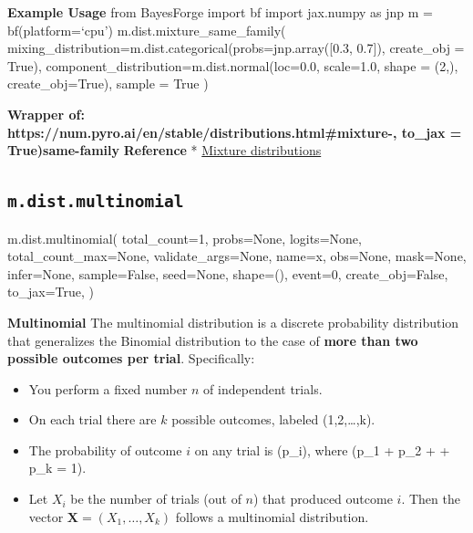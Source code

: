 \documentclass[
  letterpaper,
  DIV=11,
  numbers=noendperiod]{scrartcl}
\newenvironment{Shaded}{\begin{snugshade}}{\end{snugshade}}
\newcommand{\DecValTok}[1]{\textcolor[rgb]{0.68,0.00,0.00}{#1}}
\newcommand{\NormalTok}[1]{\textcolor[rgb]{0.00,0.23,0.31}{#1}}
\newcommand{\OperatorTok}[1]{\textcolor[rgb]{0.37,0.37,0.37}{#1}}
\newcommand{\StringTok}[1]{\textcolor[rgb]{0.13,0.47,0.30}{#1}}
\newcommand{\VariableTok}[1]{\textcolor[rgb]{0.07,0.07,0.07}{#1}}
\providecommand{\tightlist}{%
  \setlength{\itemsep}{0pt}\setlength{\parskip}{0pt}}\usepackage{longtable,booktabs,array}
\begin{document}
\textbf{Example Usage} from BayesForge import bf import jax.numpy as jnp
m = bf(platform=`cpu') m.dist.mixture\_same\_family(
mixing\_distribution=m.dist.categorical(probs=jnp.array({[}0.3, 0.7{]}),
create\_obj = True), component\_distribution=m.dist.normal(loc=0.0,
scale=1.0, shape = (2,), create\_obj=True), sample = True )

\textbf{Wrapper of:
https://num.pyro.ai/en/stable/distributions.html\#mixture-, to\_jax =
True)same-family} \textbf{Reference} *
\href{https://cseweb.ucsd.edu/~elkan/250Bwinter2011/mixturemodels.pdf}{Mixture
distributions}

\subsection{\texorpdfstring{\texttt{m.dist.multinomial}}{m.dist.multinomial}}\label{multinomial}

\begin{Shaded}
\begin{Highlighting}[]
\NormalTok{m.dist.multinomial(}
\NormalTok{    total\_count}\OperatorTok{=}\DecValTok{1}\NormalTok{,}
\NormalTok{    probs}\OperatorTok{=}\VariableTok{None}\NormalTok{,}
\NormalTok{    logits}\OperatorTok{=}\VariableTok{None}\NormalTok{,}
\NormalTok{    total\_count\_max}\OperatorTok{=}\VariableTok{None}\NormalTok{,}
\NormalTok{    validate\_args}\OperatorTok{=}\VariableTok{None}\NormalTok{,}
\NormalTok{    name}\OperatorTok{=}\StringTok{\textquotesingle{}x\textquotesingle{}}\NormalTok{,}
\NormalTok{    obs}\OperatorTok{=}\VariableTok{None}\NormalTok{,}
\NormalTok{    mask}\OperatorTok{=}\VariableTok{None}\NormalTok{,}
\NormalTok{    infer}\OperatorTok{=}\VariableTok{None}\NormalTok{,}
\NormalTok{    sample}\OperatorTok{=}\VariableTok{False}\NormalTok{,}
\NormalTok{    seed}\OperatorTok{=}\VariableTok{None}\NormalTok{,}
\NormalTok{    shape}\OperatorTok{=}\NormalTok{(),}
\NormalTok{    event}\OperatorTok{=}\DecValTok{0}\NormalTok{,}
\NormalTok{    create\_obj}\OperatorTok{=}\VariableTok{False}\NormalTok{,}
\NormalTok{    to\_jax}\OperatorTok{=}\VariableTok{True}\NormalTok{,}
\NormalTok{)}
\end{Highlighting}
\end{Shaded}

\textbf{Multinomial} The multinomial distribution is a discrete
probability distribution that generalizes the Binomial distribution to
the case of \textbf{more than two possible outcomes per trial}.
Specifically:

\begin{itemize}
\tightlist
\item
  You perform a fixed number \(n\) of independent trials.
\item
  On each trial there are \(k\) possible outcomes, labeled
  (1,2,\dots,k).
\item
  The probability of outcome \(i\) on any trial is (p\_i), where (p\_1 +
  p\_2 + \cdots + p\_k = 1).
\item
  Let \(X_i\) be the number of trials (out of \(n\)) that produced
  outcome \(i\). Then the vector \(\mathbf X = (X_1, \dots, X_k)\)
  follows a multinomial distribution.
\end{itemize}
\end{document}
